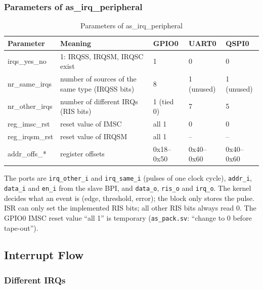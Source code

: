 \subsubsection{Parameters of as\_irq\_peripheral}
\label{subsubsec:archirqparam}

\begin{table}[H]
\caption{Parameters of as\_irq\_peripheral}
\label{tab:archirq02}
\centering
\begin{tabularx}{\textwidth}{|l|X|l|l|l|}
  \hline
  Parameter & Meaning & GPIO0 & UART0 & QSPI0 \\
  \hline
  \hline
  irqs\_yes\_no   & 1: IRQSS, IRQSM, IRQSC exist & 1 & 0 & 0 \\
  \hline
  nr\_same\_irqs  & number of sources of the same type (IRQSS bits) & 8 & 1 (unused) & 1 (unused) \\
  \hline
  nr\_other\_irqs & number of different IRQs (RIS bits) & 1 (tied 0) & 7 & 5 \\
  \hline
  reg\_imsc\_rst  & reset value of IMSC & all 1 & 0 & 0 \\
  \hline
  reg\_irqsm\_rst & reset value of IRQSM & all 1 & -- & -- \\
  \hline
  addr\_offs\_*   & register offsets & 0x18--0x50 & 0x40--0x60 & 0x40--0x60 \\
  \hline
\end{tabularx}
\end{table}

The ports are \texttt{irq\_other\_i} and \texttt{irq\_same\_i} (pulses of one
clock cycle), \texttt{addr\_i}, \texttt{data\_i} and \texttt{en\_i} from the
slave BPI, and \texttt{data\_o}, \texttt{ris\_o} and \texttt{irq\_o}. The kernel
decides what an event is (edge, threshold, error); the block only stores the
pulse. ISR can only set the implemented RIS bits; all other RIS bits always read 0. The GPIO0 IMSC reset value ``all 1'' is temporary
(\texttt{as\_pack.sv}: ``change to 0 before tape-out'').

\subsection{Interrupt Flow}
\label{subsec:archirqflow}

\subsubsection{Different IRQs}
\label{subsubsec:archirqflowdiff}

